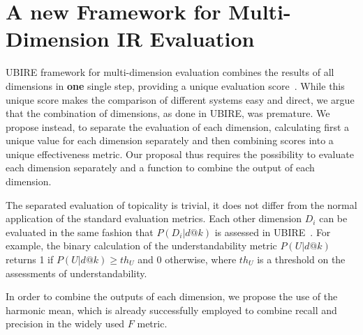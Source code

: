 
\section{A new Framework for Multi-Dimension IR Evaluation}
\label{sec:extension}

UBIRE framework for multi-dimension evaluation combines the results of all dimensions in \textbf{one} single step, providing a unique evaluation score~\cite{zuccon14,zuccon16}.
While this unique score makes the comparison of different systems easy and direct, we argue that the combination of dimensions, as done in UBIRE, was premature.
We propose instead, to separate the evaluation of each dimension, calculating first a unique value for each dimension separately and then combining scores into a unique effectiveness metric.
Our proposal thus requires the possibility to evaluate each dimension separately and a function to combine the output of each dimension.

The separated evaluation of topicality is trivial, it does not differ from the normal application of the standard evaluation metrics. 
Each other dimension $D_i$ can be evaluated in the same fashion that $P(D_i|d@k)$ is assessed in UBIRE~\cite{zuccon16}.
For example, the binary calculation of the understandability metric $P(U|d@k)$ returns 1 if $P(U|d@k) \geq th_U$ and 0 otherwise, where $th_U$ is a threshold on the assessments of understandability. 

In order to combine the outputs of each dimension, we propose the use of the harmonic mean, which is already successfully employed to combine recall and precision in the widely used $F$ metric.

